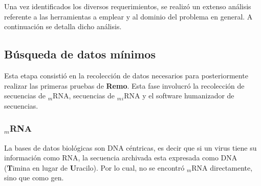 \par Una vez identificados los diversos requerimientos, se realizó un extenso análisis referente a las herramientas a emplear y al dominio del problema en general. A continuación se detalla dicho análisis.

\subsection{Búsqueda de datos mínimos}
	\par Esta etapa consistió en la recolección de datos necesarios para posteriormente realizar las primeras pruebas de \textbf{Remo}. Esta fase involucró la recolección de secuencias de $_m$RNA, secuencias de $_m$$_i$RNA y el software humanizador de secuencias. 
	
\subsubsection{$_m$RNA}
	\par La bases de datos biológicas son DNA céntricas, es decir que si un virus tiene su información como RNA, la secuencia archivada esta expresada como DNA (\textbf{T}imina en lugar de \textbf{U}racilo). Por lo cual, no se encontró $_m$RNA directamente, sino que como gen.

